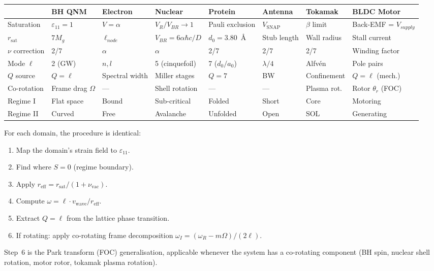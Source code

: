\begin{center}
\renewcommand{\arraystretch}{1.3}
\scriptsize
\begin{tabular}{l l l l l l l l}
\toprule
& \textbf{BH QNM} & \textbf{Electron} & \textbf{Nuclear} & \textbf{Protein} & \textbf{Antenna} & \textbf{Tokamak} & \textbf{BLDC Motor} \\
\midrule
Saturation & $\varepsilon_{11} = 1$ & $V = \alpha$ & $V_R / V_{BR} \to 1$ & Pauli exclusion & $V_\mathrm{SNAP}$ & $\beta$ limit & Back-EMF = $V_{supply}$ \\
$r_\mathrm{sat}$ & $7M_g$ & $\ell_{node}$ & $V_{BR} = 6\alpha\hbar c/D$ & $d_0 = 3.80$~\AA & Stub length & Wall radius & Stall current \\
$\nu$ correction & 2/7 & $\alpha$ & $\alpha$ & 2/7 & 2/7 & 2/7 & Winding factor \\
Mode $\ell$ & 2 (GW) & $n,l$ & 5 (cinquefoil) & 7 ($d_0/a_0$) & $\lambda/4$ & Alfv\'en & Pole pairs \\
$Q$ source & $Q = \ell$ & Spectral width & Miller stages & $Q = 7$ & BW & Confinement & $Q = \ell$ (mech.) \\
Co-rotation & Frame drag $\Omega$ & --- & Shell rotation & --- & --- & Plasma rot. & Rotor $\theta_r$ (FOC) \\
Regime I & Flat space & Bound & Sub-critical & Folded & Short & Core & Motoring \\
Regime II & Curved & Free & Avalanche & Unfolded & Open & SOL & Generating \\
\bottomrule
\end{tabular}
\end{center}
\normalsize

\noindent For each domain, the procedure is identical:
\begin{enumerate}
    \item Map the domain's strain field to $\varepsilon_{11}$.
    \item Find where $S = 0$ (regime boundary).
    \item Apply $r_\mathrm{eff} = r_\mathrm{sat}/(1 + \nu_\mathrm{vac})$.
    \item Compute $\omega = \ell \cdot v_\mathrm{wave} / r_\mathrm{eff}$.
    \item Extract $Q = \ell$ from the lattice phase transition.
    \item If rotating: apply co-rotating frame decomposition $\omega_I = (\omega_R - m\Omega)/(2\ell)$.
\end{enumerate}
\noindent Step~6 is the Park transform (FOC) generalisation, applicable whenever the system has a co-rotating component (BH spin, nuclear shell rotation, motor rotor, tokamak plasma rotation).


